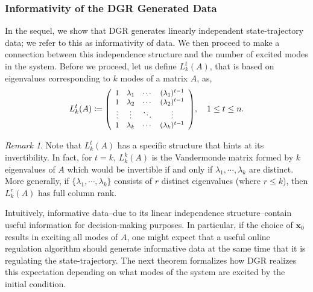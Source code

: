 \documentclass[journal]{IEEEtran}
\theoremstyle{definition}
\theoremstyle{remark}
\newtheorem{remark}{Remark}
\newcommand\x{{\bm x}}
\newcommand\scalemath[2]{\scalebox{#1}{\mbox{\ensuremath{\displaystyle #2}}}}
\begin{document}
\subsubsection{Informativity of the \ac{DGR} Generated Data}
\label{subsec:informativity}

{\color{Blue} In the sequel, we show that \ac{DGR} generates linearly independent state-trajectory data; we refer to this as informativity of data.}
We then proceed to make a connection between this independence structure 
and the number of excited modes in the system.
%
Before we proceed, let us define $L_k^t(A)$, that is based on eigenvalues corresponding to $k$ modes of a matrix $A$, as,
\begin{equation}
\label{eqn:LA}
L_k^t(A) \coloneqq \scalemath{0.9}{\left(
\begin{array}{*4{c}}
1& \lambda_{1} & \cdots & (\lambda_{1})^{t-1} \\
1& \lambda_{2} & \cdots & (\lambda_{2})^{t-1} \\
\vdots& \vdots & \ddots & \vdots  \\
1& \lambda_{k} & \cdots & (\lambda_{k})^{t-1} \\
\end{array}\right)}, \quad 1\leq t\leq n.
\end{equation}
\begin{remark}
Note that $L_k^t(A)$ has a specific structure that hints
at its invertibility.
%
In fact, for $t=k$, $L_k^k(A)$ is the Vandermonde matrix formed by $k$ eigenvalues of $A$ which would be invertible if and only if $\lambda_1, \cdots, \lambda_k$ are distinct.
%
More generally, if $\{ \lambda_1, \cdots, \lambda_k \}$ consists of $r$ distinct eigenvalues (where $r\leq k$), then $L_k^r(A)$ has full column rank. 
\end{remark}
{\color{Blue}
Intuitively, informative data--due to its linear independence structure--contain useful information for decision-making purposes.}
%
{\color{violet} In particular, if the choice of $\x_0$ results in exciting all modes of $A$, one might expect that a useful online regulation algorithm should generate informative data at the same time that it is regulating the state-trajectory. 
%
The next theorem formalizes how \ac{DGR} realizes this expectation depending on what modes of the system are excited by the initial condition.}
\end{document}
